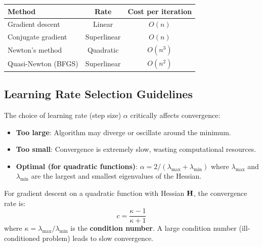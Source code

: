 \begin{keyconceptbox}[title=Convergence Rate Comparison]
\begin{center}
\begin{tabular}{lcc}
\toprule
\textbf{Method} & \textbf{Rate} & \textbf{Cost per iteration} \\
\midrule
Gradient descent & Linear & $O(n)$ \\
Conjugate gradient & Superlinear & $O(n)$ \\
Newton's method & Quadratic & $O(n^3)$ \\
Quasi-Newton (BFGS) & Superlinear & $O(n^2)$ \\
\bottomrule
\end{tabular}
\end{center}
\end{keyconceptbox}

\subsection{Learning Rate Selection Guidelines}

The choice of learning rate (step size) $\alpha$ critically affects convergence:

\begin{itemize}
    \item \textbf{Too large}: Algorithm may diverge or oscillate around the minimum.
    \item \textbf{Too small}: Convergence is extremely slow, wasting computational resources.
    \item \textbf{Optimal (for quadratic functions)}: $\alpha = 2/(\lambda_{\max} + \lambda_{\min})$ where $\lambda_{\max}$ and $\lambda_{\min}$ are the largest and smallest eigenvalues of the Hessian.
\end{itemize}

\begin{warningbox}[title=Condition Number and Convergence]
For gradient descent on a quadratic function with Hessian $\mathbf{H}$, the convergence rate is:
\begin{equation}
c = \frac{\kappa - 1}{\kappa + 1}
\end{equation}
where $\kappa = \lambda_{\max}/\lambda_{\min}$ is the \textbf{condition number}. A large condition number (ill-conditioned problem) leads to slow convergence.
\end{warningbox}

